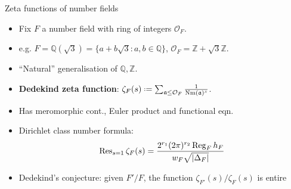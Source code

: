 \documentclass[10pt]{beamer}
\let\mf\mathfrak
\newcommand{\Z}{\mathbb{Z}}
\newcommand{\Q}{\mathbb{Q}}
\renewcommand{\O}{\mathcal{O}}
\newcommand*{\defeq}{\mathrel{\vcenter{\baselineskip0.5ex \lineskiplimit0pt
      \hbox{\scriptsize.}\hbox{\scriptsize.}}}%
  =}
\DeclareMathOperator{\Nm}{Nm}
\DeclareMathOperator{\Reg}{Reg}
\begin{document}
\begin{frame}{Zeta functions of number fields}

  \begin{itemize}[leftmargin=2pt]
  \item  Fix $F$ a number field with ring of integers $\O_{F}$.  \pause
  \item e.g. $F = \Q(\sqrt{3}) = \{ a+b\sqrt{3} : a,b \in
\Q\}$, $\O_{F} = \Z + \sqrt{3}\Z$.\pause
\item ``Natural'' generalisation of $\Q,\Z$. \pause
\item \textbf{Dedekind zeta function}: $\zeta_{F}(s)\defeq \sum_{\mf a \leq
    \O_{F}}\frac{1}{\Nm(\mf a)^{s}}$. \pause
\item Has meromorphic cont., Euler product and functional eqn.\pause
\item  Dirichlet class number formula: \pause
    \[ \Res_{s=1}\zeta_{F}(s)= \frac{2^{r_{1}}(2\pi)^{r_{2}}\Reg_{F}h_{F}
      }{w_{F}\sqrt{|\Delta_{F}|}} \] \pause
\item Dedekind's conjecture: given $F'/F$, the function $\zeta_{F'}(s)/\zeta_{F}(s)$ is entire
  \end{itemize}\vspace{-5pt}


\end{frame}
\end{document}

